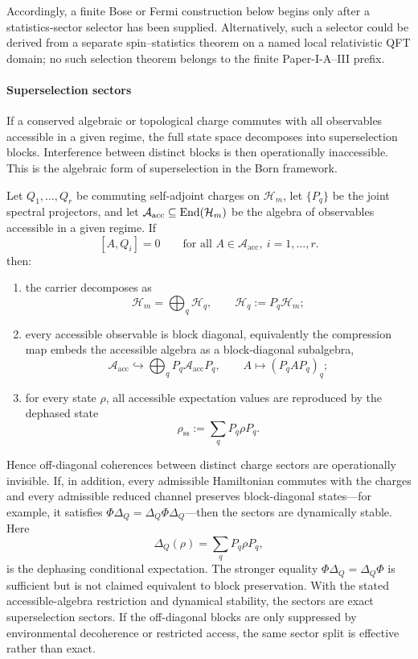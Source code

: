 \documentclass[12pt,a4paper]{article}
\begin{document}
Accordingly, a finite Bose or Fermi construction below begins only after a
statistics-sector selector has been supplied.  Alternatively, such a selector
could be derived from a separate spin--statistics theorem on a named local
relativistic QFT domain; no such selection theorem belongs to the finite
Paper-I-A--III prefix.



\paragraph{Superselection sectors}
\label{p4:sec:part2-superselection}

If a conserved algebraic or topological charge commutes with all observables accessible in a given regime, the full state space decomposes into superselection blocks.
Interference between distinct blocks is then operationally inaccessible.
This is the algebraic form of superselection in the Born framework.


\begin{theorem}
\label{p4:thm:charge-superselection}
Let $Q_1,\dots,Q_r$ be commuting self-adjoint charges on $\mathcal H_m$, let $\{P_q\}$ be the joint spectral projectors, and let $\mathcal A_{\mathrm{acc}}\subseteq \operatorname{End}(\mathcal H_m)$ be the algebra of observables accessible in a given regime.
If
\[
[A,Q_i]=0
\qquad
\text{for all }A\in \mathcal A_{\mathrm{acc}},\ i=1,\dots,r.
\]
then:
\begin{enumerate}[label=(\roman*)]
\item the carrier decomposes as
\[
\mathcal H_m=\bigoplus_q \mathcal H_q,
\qquad
\mathcal H_q:=P_q\mathcal H_m;
\]
\item every accessible observable is block diagonal, equivalently the compression map embeds the accessible algebra as a block-diagonal subalgebra,
\[
\mathcal A_{\mathrm{acc}}
\hookrightarrow
\bigoplus_q P_q\mathcal A_{\mathrm{acc}}P_q,
\qquad
A\longmapsto (P_qAP_q)_q;
\]
\item for every state $\rho$, all accessible expectation values are reproduced by the dephased state
\[
\rho_{\mathrm{ss}}:=\sum_q P_q\rho P_q.
\]
\end{enumerate}
Hence off-diagonal coherences between distinct charge sectors are operationally invisible.
If, in addition, every admissible Hamiltonian commutes with the charges and
every admissible reduced channel preserves block-diagonal states---for
example, it satisfies
\(\Phi\Delta_Q=\Delta_Q\Phi\Delta_Q\)---then the sectors are dynamically
stable.  Here
\[
\Delta_Q(\rho)=\sum_q P_q\rho P_q,
\]
is the dephasing conditional expectation.  The stronger equality
\(\Phi\Delta_Q=\Delta_Q\Phi\) is sufficient but is not claimed equivalent to
block preservation.  With the stated accessible-algebra restriction and
dynamical stability, the sectors are exact superselection sectors.  If the
off-diagonal blocks are only suppressed by environmental decoherence or
restricted access, the same sector split is effective rather than exact.
\end{theorem}
\end{document}
